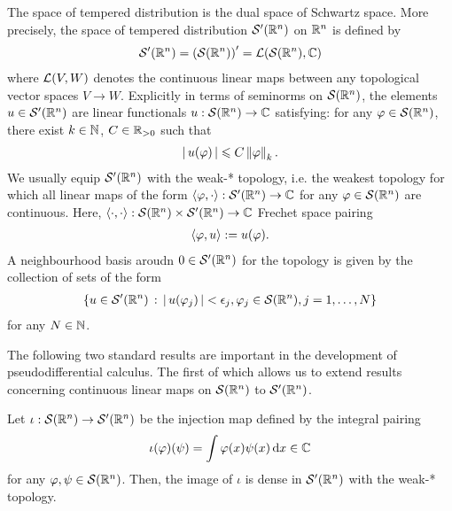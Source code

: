 \documentclass[12pt]{article}
\begin{document}
\begin{fdefinition}
    The space of tempered distribution is the dual space of Schwartz space. More precisely, the space of tempered distribution $\sch'(\R^n)$ on $\R^n$ is defined by 
    \begin{align*}
    \sch'(\R^n) = \brac{\sch(\R^n)}' = \L(\sch(\R^n),\C)
    \end{align*}
    where $\L(V, W)$ denotes the continuous linear maps between any topological vector spaces $V \to W$. Explicitly in terms of seminorms on $\sch(\R^n)$, the elements $u \in \sch'(\R^n)$ are linear functionals $u : \sch(\R^n) \to \C$ satisfying: for any $\varphi \in \sch(\R^n)$, there exist $k \in \N$, $C \in \R_{> 0}$ such that 
    \begin{align*}
    \abs{u(\varphi)} \leq C \norm[\varphi]_k. 
    \end{align*}
    We usually equip $\sch'(\R^n)$ with the weak-* topology, i.e. the weakest topology for which all linear maps of the form $\inprod[\varphi, \cdot] : \sch'(\R^n) \to \C$ for any $\varphi \in \sch(\R^n)$ are continuous. Here,  $\inprod : \sch(\R^n) \times \sch'(\R^n) \to \C$ Frechet space pairing
    \begin{align*}
    \inprod[\varphi, u] := u(\varphi). 
    \end{align*}
    A neighbourhood basis aroudn $0 \in \sch'(\R^n)$ for the topology is given by the collection of sets of the form
    \begin{align*}
    \set{u \in \sch'(\R^n) \wh \abs{u(\varphi_j)} < \epsilon_j, \varphi_j \in \sch(\R^n), j = 1, \dots, N}
    \end{align*}
    for any $N \in \N$. 
\end{fdefinition}

The following two standard results are important in the development of pseudodifferential calculus. The first of which allows us to extend results concerning continuous linear maps on $\sch(\R^n)$ to $\sch'(\R^n)$. 
\begin{flemma}
    Let $\iota : \sch(\R^n) \to \sch'(\R^n)$ be the injection map defined by the integral pairing 
    \begin{align*}
    \iota(\varphi)(\psi) = \int \varphi(x) \psi(x) \d[x] \in \C
    \end{align*}
    for any $\varphi, \psi \in \sch(\R^n)$. Then, the image of $\iota$ is dense in $\sch'(\R^n)$ with the weak-* topology. 
\end{flemma}    
\end{document}
